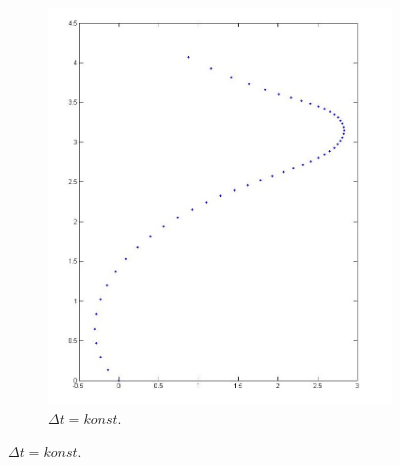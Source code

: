\documentclass[a4paper]{IEEEtran}
\begin{document}
	\begin{figure}[h]
		\centering
		\begin{subfigure}{.4\textwidth}
			\centering
			\includegraphics[width=\linewidth]{konstDt.jpg}
			\caption{$\Delta t=konst.$}
			\label{fig:constDt}
		\end{subfigure}%
	

\end{figure}
\end{document}
